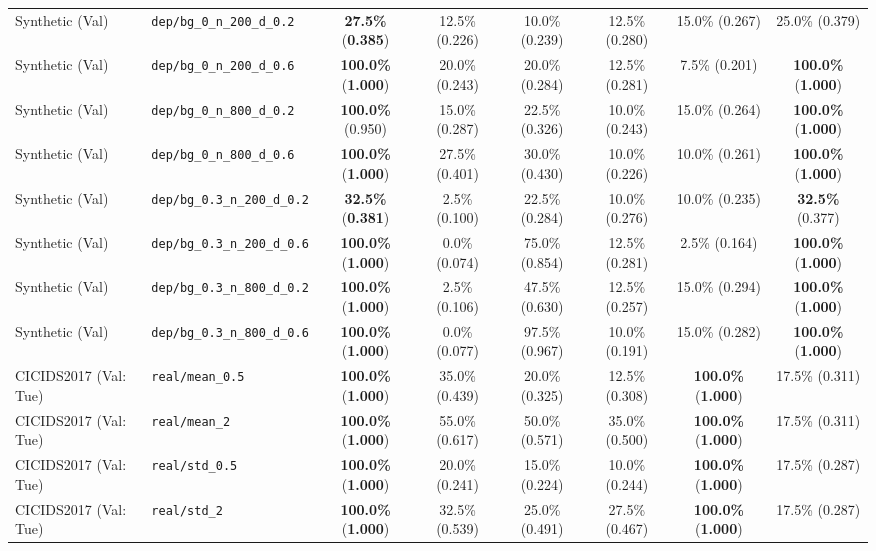 \documentclass[10pt,conference]{IEEEtran}
\begin{document}
\begin{table}[!tp]
{\begin{tabular}{llcccccc}
Synthetic (Val) & \texttt{dep/bg\_0\_n\_200\_d\_0.2} & \textbf{27.5\%} (\textbf{0.385}) & 12.5\% (0.226) & 10.0\% (0.239) & 12.5\% (0.280) & 15.0\% (0.267) & 25.0\% (0.379) \\
Synthetic (Val) & \texttt{dep/bg\_0\_n\_200\_d\_0.6} & \textbf{100.0\%} (\textbf{1.000}) & 20.0\% (0.243) & 20.0\% (0.284) & 12.5\% (0.281) & 7.5\% (0.201) & \textbf{100.0\%} (\textbf{1.000}) \\
Synthetic (Val) & \texttt{dep/bg\_0\_n\_800\_d\_0.2} & \textbf{100.0\%} (0.950) & 15.0\% (0.287) & 22.5\% (0.326) & 10.0\% (0.243) & 15.0\% (0.264) & \textbf{100.0\%} (\textbf{1.000}) \\
Synthetic (Val) & \texttt{dep/bg\_0\_n\_800\_d\_0.6} & \textbf{100.0\%} (\textbf{1.000}) & 27.5\% (0.401) & 30.0\% (0.430) & 10.0\% (0.226) & 10.0\% (0.261) & \textbf{100.0\%} (\textbf{1.000}) \\
Synthetic (Val) & \texttt{dep/bg\_0.3\_n\_200\_d\_0.2} & \textbf{32.5\%} (\textbf{0.381}) & 2.5\% (0.100) & 22.5\% (0.284) & 10.0\% (0.276) & 10.0\% (0.235) & \textbf{32.5\%} (0.377) \\
Synthetic (Val) & \texttt{dep/bg\_0.3\_n\_200\_d\_0.6} & \textbf{100.0\%} (\textbf{1.000}) & 0.0\% (0.074) & 75.0\% (0.854) & 12.5\% (0.281) & 2.5\% (0.164) & \textbf{100.0\%} (\textbf{1.000}) \\
Synthetic (Val) & \texttt{dep/bg\_0.3\_n\_800\_d\_0.2} & \textbf{100.0\%} (\textbf{1.000}) & 2.5\% (0.106) & 47.5\% (0.630) & 12.5\% (0.257) & 15.0\% (0.294) & \textbf{100.0\%} (\textbf{1.000}) \\
Synthetic (Val) & \texttt{dep/bg\_0.3\_n\_800\_d\_0.6} & \textbf{100.0\%} (\textbf{1.000}) & 0.0\% (0.077) & 97.5\% (0.967) & 10.0\% (0.191) & 15.0\% (0.282) & \textbf{100.0\%} (\textbf{1.000}) \\
\midrule
CICIDS2017 (Val: Tue) & \texttt{real/mean\_0.5} & \textbf{100.0\%} (\textbf{1.000}) & 35.0\% (0.439) & 20.0\% (0.325) & 12.5\% (0.308) & \textbf{100.0\%} (\textbf{1.000}) & 17.5\% (0.311) \\
CICIDS2017 (Val: Tue) & \texttt{real/mean\_2} & \textbf{100.0\%} (\textbf{1.000}) & 55.0\% (0.617) & 50.0\% (0.571) & 35.0\% (0.500) & \textbf{100.0\%} (\textbf{1.000}) & 17.5\% (0.311) \\
CICIDS2017 (Val: Tue) & \texttt{real/std\_0.5} & \textbf{100.0\%} (\textbf{1.000}) & 20.0\% (0.241) & 15.0\% (0.224) & 10.0\% (0.244) & \textbf{100.0\%} (\textbf{1.000}) & 17.5\% (0.287) \\
CICIDS2017 (Val: Tue) & \texttt{real/std\_2} & \textbf{100.0\%} (\textbf{1.000}) & 32.5\% (0.539) & 25.0\% (0.491) & 27.5\% (0.467) & \textbf{100.0\%} (\textbf{1.000}) & 17.5\% (0.287) \\

\end{tabular}}
\end{table}
\end{document}
